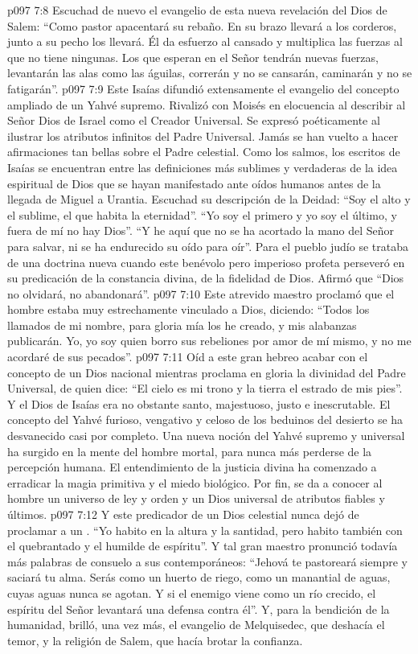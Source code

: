 \vs p097 7:8 Escuchad de nuevo el evangelio de esta nueva revelación del Dios de Salem: “Como pastor apacentará su rebaño. En su brazo llevará a los corderos, junto a su pecho los llevará. Él da esfuerzo al cansado y multiplica las fuerzas al que no tiene ningunas. Los que esperan en el Señor tendrán nuevas fuerzas, levantarán las alas como las águilas, correrán y no se cansarán, caminarán y no se fatigarán”.
\vs p097 7:9 Este Isaías difundió extensamente el evangelio del concepto ampliado de un Yahvé supremo. Rivalizó con Moisés en elocuencia al describir al Señor Dios de Israel como el Creador Universal. Se expresó poéticamente al ilustrar los atributos infinitos del Padre Universal. Jamás se han vuelto a hacer afirmaciones tan bellas sobre el Padre celestial. Como los salmos, los escritos de Isaías se encuentran entre las definiciones más sublimes y verdaderas de la idea espiritual de Dios que se hayan manifestado ante oídos humanos antes de la llegada de Miguel a Urantia. Escuchad su descripción de la Deidad: “Soy el alto y el sublime, el que habita la eternidad”. “Yo soy el primero y yo soy el último, y fuera de mí no hay Dios”. “Y he aquí que no se ha acortado la mano del Señor para salvar, ni se ha endurecido su oído para oír”. Para el pueblo judío se trataba de una doctrina nueva cuando este benévolo pero imperioso profeta perseveró en su predicación de la constancia divina, de la fidelidad de Dios. Afirmó que “Dios no olvidará, no abandonará”.
\vs p097 7:10 Este atrevido maestro proclamó que el hombre estaba muy estrechamente vinculado a Dios, diciendo: “Todos los llamados de mi nombre, para gloria mía los he creado, y mis alabanzas publicarán. Yo, yo soy quien borro sus rebeliones por amor de mí mismo, y no me acordaré de sus pecados”.
\vs p097 7:11 Oíd a este gran hebreo acabar con el concepto de un Dios nacional mientras proclama en gloria la divinidad del Padre Universal, de quien dice: “El cielo es mi trono y la tierra el estrado de mis pies”. Y el Dios de Isaías era no obstante santo, majestuoso, justo e inescrutable. El concepto del Yahvé furioso, vengativo y celoso de los beduinos del desierto se ha desvanecido casi por completo. Una nueva noción del Yahvé supremo y universal ha surgido en la mente del hombre mortal, para nunca más perderse de la percepción humana. El entendimiento de la justicia divina ha comenzado a erradicar la magia primitiva y el miedo biológico. Por fin, se da a conocer al hombre un universo de ley y orden y un Dios universal de atributos fiables y últimos.
\vs p097 7:12 Y este predicador de un Dios celestial nunca dejó de proclamar a un . “Yo habito en la altura y la santidad, pero habito también con el quebrantado y el humilde de espíritu”. Y tal gran maestro pronunció todavía más palabras de consuelo a sus contemporáneos: “Jehová te pastoreará siempre y saciará tu alma. Serás como un huerto de riego, como un manantial de aguas, cuyas aguas nunca se agotan. Y si el enemigo viene como un río crecido, el espíritu del Señor levantará una defensa contra él”. Y, para la bendición de la humanidad, brilló, una vez más, el evangelio de Melquisedec, que deshacía el temor, y la religión de Salem, que hacía brotar la confianza.
